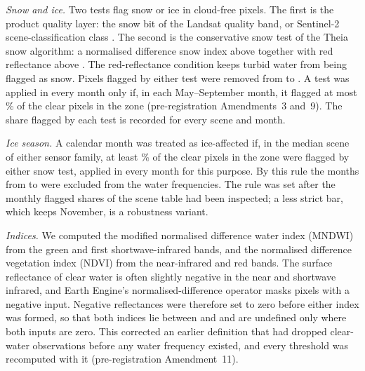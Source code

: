 \emph{Snow and ice.} Two tests flag snow or ice in cloud-free pixels. The first is the product quality layer: the snow bit of the Landsat quality band\citep{usgs_l45tm_c2l2,usgs_l7etm_c2l2,usgs_l89oli_c2l2}, or Sentinel-2 scene-classification class . The second is the conservative snow test of the Theia snow algorithm\citep{gascoin2019}: a normalised difference snow index above  together with red reflectance above . The red-reflectance condition keeps turbid water from being flagged as snow. Pixels flagged by either test were removed from  to . A test was applied in every month only if, in each May--September month, it flagged at most \% of the clear pixels in the zone (pre-registration Amendments~3 and~9). The share flagged by each test is recorded for every scene and month.

\emph{Ice season.} A calendar month was treated as ice-affected if, in the median scene of either sensor family, at least \% of the clear pixels in the zone were flagged by either snow test, applied in every month for this purpose. By this rule the months from  to  were excluded from the water frequencies. The rule was set after the monthly flagged shares of the scene table had been inspected; a less strict bar, which keeps November, is a robustness variant.

\emph{Indices.} We computed the modified normalised difference water index (MNDWI) from the green and first shortwave-infrared bands\citep{xu2006}, and the normalised difference vegetation index (NDVI) from the near-infrared and red bands. The surface reflectance of clear water is often slightly negative in the near and shortwave infrared, and Earth Engine's normalised-difference operator masks pixels with a negative input. Negative reflectances were therefore set to zero before either index was formed, so that both indices lie between  and  and are undefined only where both inputs are zero. This corrected an earlier definition that had dropped clear-water observations before any water frequency existed, and every threshold was recomputed with it (pre-registration Amendment~11).

